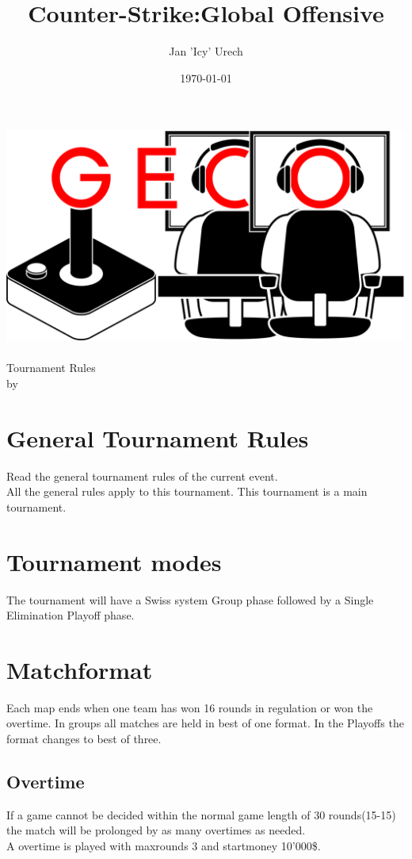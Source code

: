 \documentclass{article}
\title{Counter-Strike:Global Offensive}
\author{Jan 'Icy' Urech }
\date{\today}
\begin{document}
\makeatletter
\begin{titlepage}
\centering
\includegraphics[scale=0.075]{../img/GECo.png}\\
\LARGE \@title\\ Tournament Rules\\ \normalsize by \@author\\ \@date
\end{titlepage}
\makeatother


\clearpage

\tableofcontents
\clearpage

\section{General Tournament Rules}
Read the general tournament rules of the current event.\\
All the general rules apply to this tournament. This tournament is a main tournament.

\section{Tournament modes}
The tournament will have a Swiss system Group phase followed by a Single Elimination Playoff phase.

\section{Matchformat}
Each map ends when one team has won 16 rounds in regulation or won the overtime.
In groups all matches are held in best of one format. In the Playoffs the format changes to best of three.

\subsection{Overtime}
If a game cannot be decided within the normal game length of 30 rounds(15-15) the match will be prolonged by as many overtimes as needed.\\
A overtime is played with maxrounds 3 and startmoney 10'000\$.
\end{document}
